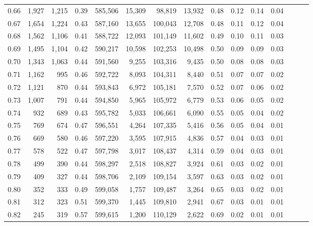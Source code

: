 \begin{tabular}{rrrrrrrrrrrrrrr}
0.66 &   1,927 &  1,215 &  0.39 &  585,506 &   15,309 &   98,819 &   13,932 &  0.48 &  0.12 &  0.14 &      0.04 \\
0.67 &   1,654 &  1,224 &  0.43 &  587,160 &   13,655 &  100,043 &   12,708 &  0.48 &  0.11 &  0.12 &      0.04 \\
0.68 &   1,562 &  1,106 &  0.41 &  588,722 &   12,093 &  101,149 &   11,602 &  0.49 &  0.10 &  0.11 &      0.03 \\
0.69 &   1,495 &  1,104 &  0.42 &  590,217 &   10,598 &  102,253 &   10,498 &  0.50 &  0.09 &  0.09 &      0.03 \\
0.70 &   1,343 &  1,063 &  0.44 &  591,560 &    9,255 &  103,316 &    9,435 &  0.50 &  0.08 &  0.08 &      0.03 \\
0.71 &   1,162 &    995 &  0.46 &  592,722 &    8,093 &  104,311 &    8,440 &  0.51 &  0.07 &  0.07 &      0.02 \\
0.72 &   1,121 &    870 &  0.44 &  593,843 &    6,972 &  105,181 &    7,570 &  0.52 &  0.07 &  0.06 &      0.02 \\
0.73 &   1,007 &    791 &  0.44 &  594,850 &    5,965 &  105,972 &    6,779 &  0.53 &  0.06 &  0.05 &      0.02 \\
0.74 &     932 &    689 &  0.43 &  595,782 &    5,033 &  106,661 &    6,090 &  0.55 &  0.05 &  0.04 &      0.02 \\
0.75 &     769 &    674 &  0.47 &  596,551 &    4,264 &  107,335 &    5,416 &  0.56 &  0.05 &  0.04 &      0.01 \\
0.76 &     669 &    580 &  0.46 &  597,220 &    3,595 &  107,915 &    4,836 &  0.57 &  0.04 &  0.03 &      0.01 \\
0.77 &     578 &    522 &  0.47 &  597,798 &    3,017 &  108,437 &    4,314 &  0.59 &  0.04 &  0.03 &      0.01 \\
0.78 &     499 &    390 &  0.44 &  598,297 &    2,518 &  108,827 &    3,924 &  0.61 &  0.03 &  0.02 &      0.01 \\
0.79 &     409 &    327 &  0.44 &  598,706 &    2,109 &  109,154 &    3,597 &  0.63 &  0.03 &  0.02 &      0.01 \\
0.80 &     352 &    333 &  0.49 &  599,058 &    1,757 &  109,487 &    3,264 &  0.65 &  0.03 &  0.02 &      0.01 \\
0.81 &     312 &    323 &  0.51 &  599,370 &    1,445 &  109,810 &    2,941 &  0.67 &  0.03 &  0.01 &      0.01 \\
0.82 &     245 &    319 &  0.57 &  599,615 &    1,200 &  110,129 &    2,622 &  0.69 &  0.02 &  0.01 &      0.01 \\

\end{tabular}
